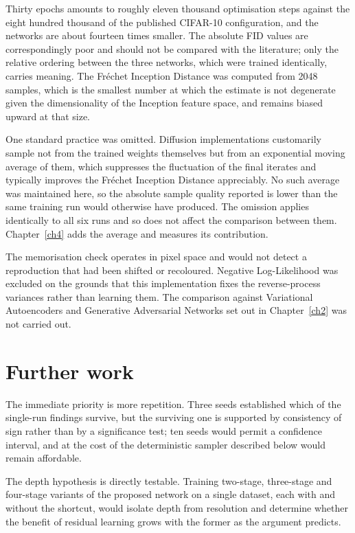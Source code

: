 Thirty epochs amounts to roughly eleven thousand optimisation steps against the eight hundred
thousand of the published CIFAR-10 configuration, and the networks are about fourteen times smaller.
The absolute FID values are correspondingly poor and should not be compared with the literature;
only the relative ordering between the three networks, which were trained identically, carries
meaning. The Fr\'echet Inception Distance was computed from 2048 samples, which is the smallest
number at which the estimate is not degenerate given the dimensionality of the Inception feature
space, and remains biased upward at that size.

One standard practice was omitted. Diffusion implementations customarily sample not from the trained
weights themselves but from an exponential moving average of them, which suppresses the fluctuation
of the final iterates and typically improves the Fr\'echet Inception Distance appreciably. No such
average was maintained here, so the absolute sample quality reported is lower than the same training
run would otherwise have produced. The omission applies identically to all six runs and so does not
affect the comparison between them. Chapter~\ref{ch4} adds the average and measures its
contribution.

The memorisation check operates in pixel space and would not detect a reproduction that had been
shifted or recoloured. Negative Log-Likelihood was excluded on the grounds that this implementation
fixes the reverse-process variances rather than learning them. The comparison against Variational
Autoencoders and Generative Adversarial Networks set out in Chapter~\ref{ch2} was not carried out.

\section*{Further work}

The immediate priority is more repetition. Three seeds established which of the single-run findings
survive, but the surviving one is supported by consistency of sign rather than by a significance
test; ten seeds would permit a confidence interval, and at the cost of the deterministic sampler
described below would remain affordable.

The depth hypothesis is directly testable. Training two-stage, three-stage and four-stage variants
of the proposed network on a single dataset, each with and without the shortcut, would isolate depth
from resolution and determine whether the benefit of residual learning grows with the former as the
argument predicts.

